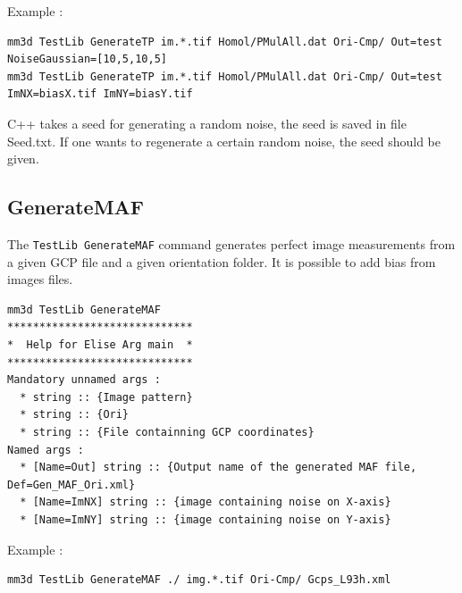 Example :
\begin{verbatim}
mm3d TestLib GenerateTP im.*.tif Homol/PMulAll.dat Ori-Cmp/ Out=test NoiseGaussian=[10,5,10,5]
mm3d TestLib GenerateTP im.*.tif Homol/PMulAll.dat Ori-Cmp/ Out=test ImNX=biasX.tif ImNY=biasY.tif
\end{verbatim}
C++ takes a seed for generating a random noise, the seed is saved in file Seed.txt. If one wants to regenerate a certain random noise, the seed should be given.


\subsection{GenerateMAF}
The {\tt TestLib GenerateMAF} command generates perfect image measurements from a given GCP file and a given orientation folder. It is possible to add bias from images files.

\begin{verbatim}
mm3d TestLib GenerateMAF
*****************************
*  Help for Elise Arg main  *
*****************************
Mandatory unnamed args : 
  * string :: {Image pattern}
  * string :: {Ori}
  * string :: {File containning GCP coordinates}
Named args : 
  * [Name=Out] string :: {Output name of the generated MAF file, Def=Gen_MAF_Ori.xml}
  * [Name=ImNX] string :: {image containing noise on X-axis}
  * [Name=ImNY] string :: {image containing noise on Y-axis}
\end{verbatim}

Example :
\begin{verbatim}
mm3d TestLib GenerateMAF ./ img.*.tif Ori-Cmp/ Gcps_L93h.xml
\end{verbatim}


